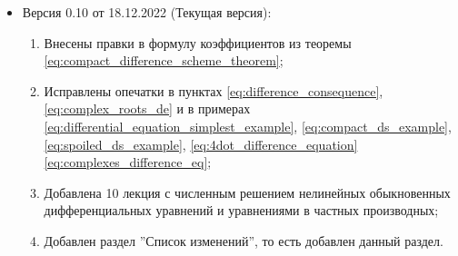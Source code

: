 \documentclass{article}
\begin{document}

\begin{itemize}[nosep]
\item Версия 0.10 от 18.12.2022 (Текущая версия):
	\begin{enumerate}[nosep]
		\item Внесены правки в формулу коэффициентов из
			теоремы
			\eqref{eq:compact_difference_scheme_theorem};
		\item Исправлены опечатки в пунктах
			\eqref{eq:difference_consequence},
			\eqref{eq:complex_roots_de}
			и в примерах
			\eqref{eq:differential_equation_simplest_example},
			\eqref{eq:compact_ds_example},
			\eqref{eq:spoiled_ds_example},
			\eqref{eq:4dot_difference_equation}
			\eqref{eq:complexes_difference_eq};
		\item Добавлена 10 лекция с численным решением нелинейных
			обыкновенных дифференциальных уравнений и уравнениями
			в частных производных;
		\item Добавлен раздел ''Список изменений'', то есть добавлен
			данный раздел.
	\end{enumerate}
\end{itemize}
\end{document}
